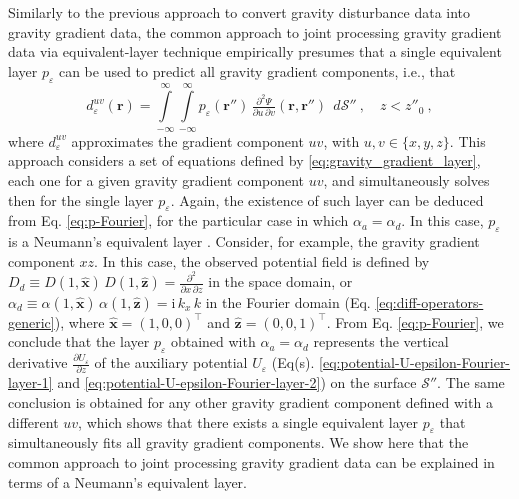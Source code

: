Similarly to the previous approach to convert gravity disturbance data into gravity gradient 
data, the common approach to joint processing gravity gradient data 
\citep[e.g.,][]{boggs-dransfield2004,barnes_lumley2011, martinez_li_2016} via equivalent-layer 
technique empirically presumes that a single equivalent layer $p_{\varepsilon}$ can be used to 
predict all gravity gradient components, i.e., that
\begin{equation}
	d^{uv}_{\varepsilon}(\mathbf{r}) = 
	\int\limits_{-\infty}^{\infty}\int\limits_{-\infty}^{\infty}
	p_{\varepsilon}(\mathbf{r}'') \, 
	\tfrac{\partial^{2} \Psi}{\partial u \, \partial v}(\mathbf{r}, \mathbf{r}'') \:\: 
	d\mathcal{S}'' \: , \quad z < z''_{0} \: ,
	\label{eq:gravity_gradient_layer}
\end{equation}
where $d^{uv}_{\varepsilon}$ approximates the gradient component $uv$, with 
$u, v \in \{x, y, z\}$.
This approach considers a set of equations defined by \ref{eq:gravity_gradient_layer}, each one
for a given gravity gradient component $uv$, and simultaneously solves then for the single 
layer $p_{\varepsilon}$.
Again, the existence of such layer can be deduced from Eq. \ref{eq:p-Fourier}, for the 
particular case in which 
$\alpha_{a} = \alpha_{d}$. In this case, $p_{\varepsilon}$ is a Neumann's equivalent layer 
\citep{oliveirajr_etal2026_1}.
Consider, for example, the gravity gradient component $xz$. In this case, 
the observed potential field is defined by 
$D_{d} \equiv D(1, \hat{\mathbf{x}}) \, D(1, \hat{\mathbf{z}}) = \tfrac{\partial^{2}}{\partial x \, \partial z}$ in the
space domain, or 
$\alpha_{d} \equiv \alpha(1, \hat{\mathbf{x}}) \, \alpha(1, \hat{\mathbf{z}}) = \mathrm{i} \, k_{x} \, k$
in the Fourier domain (Eq. \ref{eq:diff-operators-generic}), where 
$\hat{\mathbf{x}} = (1, 0, 0)^{\top}$ and
$\hat{\mathbf{z}} = (0, 0, 1)^{\top}$.
From Eq. \ref{eq:p-Fourier}, we conclude that the layer $p_{\varepsilon}$ obtained with 
$\alpha_{a} = \alpha_{d}$ represents the vertical derivative 
$\tfrac{\partial U_{\varepsilon}}{\partial z}$ of the auxiliary potential 
$U_{\varepsilon}$ (Eq(s). \ref{eq:potential-U-epsilon-Fourier-layer-1} and 
\ref{eq:potential-U-epsilon-Fourier-layer-2}) 
on the surface $\mathcal{S}''$.
The same conclusion is obtained for any other gravity gradient component defined with a 
different $uv$, which shows that there exists a single equivalent layer $p_{\varepsilon}$ that 
simultaneously fits all gravity gradient components.
We show here that the common approach to joint processing gravity gradient data 
\citep[e.g.,][]{boggs-dransfield2004,barnes_lumley2011, martinez_li_2016} can be explained in 
terms of a Neumann's equivalent layer.

